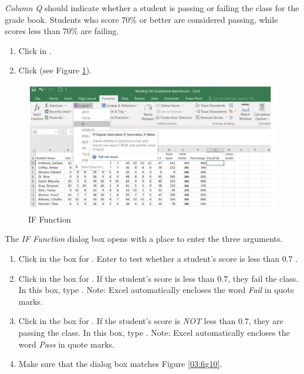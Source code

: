 \textit{Column Q} should indicate whether a student is passing or failing the class for the grade book. Students who score $ 70\% $ or better are considered passing, while scores less than $ 70\% $ are failing.

\begin{enumbox}
	\begin{enumerate}
		\item Click in .
		\item Click  (see Figure \ref{03:fig09}).
	\end{enumerate}
\end{enumbox}
	
\begin{figure}[H]
	\centering
	\includegraphics[width=\maxwidth{.95\linewidth}]{gfx/ch03_fig09}
	\caption{IF Function}
	\label{03:fig09}
\end{figure}

The \textit{IF Function} dialog box opens with a place to enter the three arguments.

\begin{enumbox}
	\begin{enumerate}
		\item Click in the box for . Enter  to test whether a student's score is less than $ 0.7 $ .
		\item Click in the box for . If the student's score is less than $ 0.7 $, they fail the class. In this box, type . Note: Excel automatically encloses the word \textit{Fail} in quote marks.
		\item Click in the box for . If the student's score is \textit{NOT} less than $ 0.7 $, they are passing the class. In this box, type . Note: Excel automatically encloses the word \textit{Pass} in quote marks.
		\item Make sure that the dialog box matches Figure \ref{03:fig10}.
	\end{enumerate}
\end{enumbox}
	
